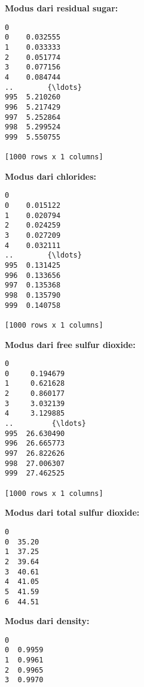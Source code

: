 \documentclass[11pt]{article}
\begin{document}
    
    \textbf{Modus dari residual sugar:}

    
    
    \begin{Verbatim}[commandchars=\\\{\}]
            0
0    0.032555
1    0.033333
2    0.051774
3    0.077156
4    0.084744
..        {\ldots}
995  5.210260
996  5.217429
997  5.252864
998  5.299524
999  5.550755

[1000 rows x 1 columns]
    \end{Verbatim}

    
    \textbf{Modus dari chlorides:}

    
    
    \begin{Verbatim}[commandchars=\\\{\}]
            0
0    0.015122
1    0.020794
2    0.024259
3    0.027209
4    0.032111
..        {\ldots}
995  0.131425
996  0.133656
997  0.135368
998  0.135790
999  0.140758

[1000 rows x 1 columns]
    \end{Verbatim}

    
    \textbf{Modus dari free sulfur dioxide:}

    
    
    \begin{Verbatim}[commandchars=\\\{\}]
             0
0     0.194679
1     0.621628
2     0.860177
3     3.032139
4     3.129885
..         {\ldots}
995  26.630490
996  26.665773
997  26.822626
998  27.006307
999  27.462525

[1000 rows x 1 columns]
    \end{Verbatim}

    
    \textbf{Modus dari total sulfur dioxide:}

    
    
    \begin{Verbatim}[commandchars=\\\{\}]
       0
0  35.20
1  37.25
2  39.64
3  40.61
4  41.05
5  41.59
6  44.51
    \end{Verbatim}

    
    \textbf{Modus dari density:}

    
    
    \begin{Verbatim}[commandchars=\\\{\}]
        0
0  0.9959
1  0.9961
2  0.9965
3  0.9970
    \end{Verbatim}
\end{document}
